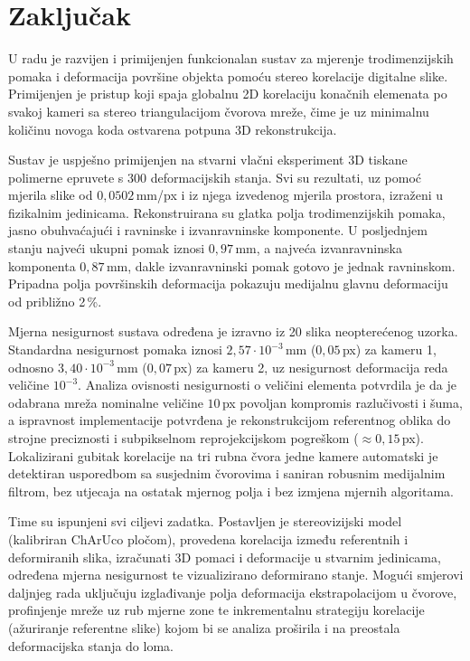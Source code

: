 \section{Zaključak}

U radu je razvijen i primijenjen funkcionalan sustav za mjerenje trodimenzijskih
pomaka i deformacija površine objekta pomoću stereo korelacije digitalne slike.
Primijenjen je pristup koji spaja globalnu 2D korelaciju konačnih elemenata po svakoj
kameri sa stereo triangulacijom čvorova mreže, čime je uz minimalnu količinu novoga
koda ostvarena potpuna 3D rekonstrukcija.

Sustav je uspješno primijenjen na stvarni vlačni eksperiment 3D tiskane polimerne
epruvete s 300 deformacijskih stanja. Svi su rezultati, uz pomoć mjerila slike od
$0{,}0502$\,mm/px i iz njega izvedenog mjerila prostora, izraženi u fizikalnim
jedinicama. Rekonstruirana su glatka polja trodimenzijskih pomaka, jasno
obuhvaćajući i ravninske
i izvanravninske komponente. U posljednjem stanju najveći ukupni pomak iznosi
$0{,}97$\,mm, a najveća izvanravninska komponenta $0{,}87$\,mm, dakle izvanravninski
pomak gotovo je jednak ravninskom. Pripadna polja površinskih deformacija pokazuju
medijalnu glavnu deformaciju od približno 2\,\%.

Mjerna nesigurnost sustava određena je izravno iz 20 slika neopterećenog uzorka.
Standardna nesigurnost pomaka iznosi $2{,}57\cdot10^{-3}$\,mm ($0{,}05$\,px) za
kameru 1, odnosno $3{,}40\cdot10^{-3}$\,mm ($0{,}07$\,px) za kameru 2, uz
nesigurnost deformacija reda veličine $10^{-3}$. Analiza ovisnosti nesigurnosti
o veličini elementa potvrdila je da je odabrana mreža nominalne veličine $10$\,px
povoljan kompromis razlučivosti i šuma, a ispravnost implementacije potvrđena je
rekonstrukcijom referentnog oblika do
strojne preciznosti i subpikselnom reprojekcijskom pogreškom ($\approx 0{,}15$\,px).
Lokalizirani gubitak korelacije na tri rubna čvora jedne kamere automatski je
detektiran usporedbom sa susjednim čvorovima i saniran robusnim medijalnim filtrom,
bez utjecaja na ostatak mjernog polja i bez izmjena mjernih algoritama.

Time su ispunjeni svi ciljevi zadatka. Postavljen je stereovizijski model
(kalibriran ChArUco pločom), provedena
korelacija između referentnih i deformiranih slika, izračunati 3D pomaci i
deformacije u stvarnim jedinicama, određena mjerna nesigurnost te vizualizirano
deformirano stanje. Mogući smjerovi daljnjeg rada
uključuju izglađivanje polja deformacija ekstrapolacijom u čvorove, profinjenje mreže
uz rub mjerne zone te inkrementalnu strategiju korelacije (ažuriranje referentne
slike) kojom bi se analiza proširila i na preostala deformacijska stanja do loma.
